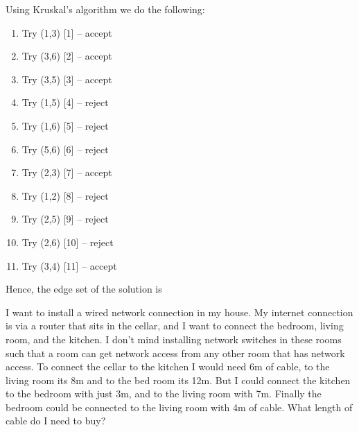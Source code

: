 
\solution
Using Kruskal's algorithm we do the following:
\begin{enumerate}
\item Try (1,3) [1] -- accept 
\item Try (3,6) [2] -- accept
\item Try (3,5) [3] -- accept
\item Try (1,5) [4] -- reject
\item Try (1,6) [5] -- reject
\item Try (5,6) [6] -- reject
\item Try (2,3) [7] -- accept
\item Try (1,2) [8] -- reject
\item Try (2,5) [9] -- reject
\item Try (2,6) [10] -- reject
\item Try (3,4) [11] -- accept
\end{enumerate}
Hence, the edge set of the solution is 






 I want to install a wired network connection in my house. My internet connection is via a router that sits in the cellar, and I want to connect the bedroom, living room, and the kitchen. I don't mind installing network switches in these rooms such that a room can get network access from any other room that has network access. To connect the cellar to the kitchen I would need 6m of cable, to the living room its 8m and to the bed room its 12m. But I could connect the kitchen to the bedroom with just 3m, and to the living room with 7m. Finally the bedroom could be connected to the living room with 4m of cable. What length of cable do I need to buy? 


